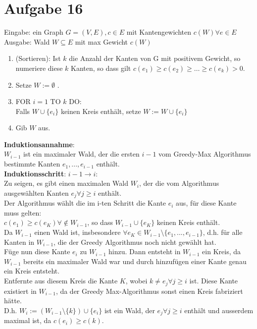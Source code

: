 \documentclass[a4paper,10pt,german]{scrartcl}
\begin{document}
\section{Aufgabe 16}

Eingabe: ein Graph $ G=(V,E), c \in E $ mit Kantengewichten $c(W) \forall e \in E$ \\
Ausgabe: Wald $W \subseteq E$ mit max Gewicht $c(W)$ \\
\begin{enumerate}\itemsep1pt \parskip0pt 
\item (Sortieren): Ist $k$ die Anzahl der Kanten von G mit positivem Gewicht, so numeriere diese $k$ Kanten, so dass gilt $ c(e_1) \geq c(e_2) \geq \ldots \geq c(e_k) > 0$.\\
\item Setze $W := \emptyset $ .\\
\item FOR $i=1$ TO $k$ DO: \\
\-\hspace{1cm} Falls $W \cup \{ e_i\}$ keinen Kreis enth\"alt, setze $W:=W \cup \{ e_i\} $ \\
\item Gib $W$ aus.
\end{enumerate}

\textbf{Induktionsannahme}: \\
$W_{i-1}$ ist ein maximaler Wald, der die ersten $i-1$ vom Greedy-Max Algorithmus bestimmte Kanten $e_1, ..., e_{i-1}$ enth\"alt.\\
\textbf{Induktionsschritt}: $i-1 \rightarrow i$: \\
Zu seigen, es gibt einen maximalen Wald $W_i$, der die vom Algorithmus ausgew\"ahlten Kanten $e_j \forall j\geq i$ enth\"alt.\\
Der Algorithmus w\"ahlt die im i-ten Schritt die Kante $e_i$ aus, f\"ur diese Kante muss gelten: \\
$c(e_1) \geq c(e_K) \forall \notin W_{i-1}$, so dass $W_{i-1} \cup \{ e_K\}$ keinen Kreis enth\"alt.\\
Da $W_{i-1}$ einen Wald ist, insbesondere $\forall e_K \in W_{i-1} \setminus \{ e_1, ..., e_{i-1}\}$, d.h. f\"ur alle Kanten in $W_{i-1}$, die der Greedy Algorithmus noch nicht gew\"ahlt hat.\\
F\"uge nun diese Kante $e_i$ zu $W_{i-1}$ hinzu. Dann entsteht in $W_{i-1}$ ein Kreis, da $W_{i-1}$ bereits ein maximaler Wald war und durch hinzuf\"ugen einer Kante genau ein Kreis entsteht.\\
Entfernte aus diesem Kreis die Kante $K$, wobei $k \neq e_j \forall j \geq i$ ist. Diese Kante existiert in $W_{i-1}$, da der Greedy Max-Algorithmus sonst einen Kreis fabriziert h\"atte.\\
D.h. $W_i := ( W_{i-1} \setminus \{ k\} ) \cup \{ e_i\} $ ist ein Wald, der $e_j \forall j \geq i$ enth\"alt und ausserdem maximal ist, da $c(e_i) \geq c(k)$.
\end{document}
